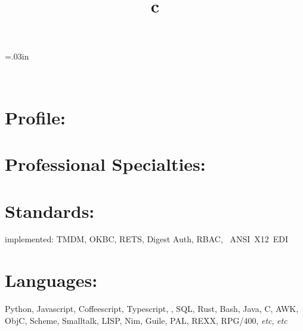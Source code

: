 \documentclass[line,margin,hidelinks]{res}
\begin{document}
\def\resOrCvLink{
  \href{\cvUrl}{full CV}}



\begin{resume}

\end{resume}

\sectionskip=.03in

\begin{format}
\title{c}\\
\end{format}


\section{Profile:
  \maybemugshot
}



\section{Professional Specialties:}


\section{Standards:}
\begin{par}
implemented:
TMDM,
OKBC,
RETS,
Digest Auth,
RBAC,
~ANSI~X12~EDI
\end{par}

\section{Languages:}
\begin{par}
  Python, Javascript, Coffeescript, Typescript, \PS, SQL, Rust, Bash,
  Java, C, AWK, ObjC, Scheme, Smalltalk, LISP, Nim, Guile, PAL, REXX, RPG/400,
  \textit{etc}, \textit{etc}
\end{par}
\end{document}
